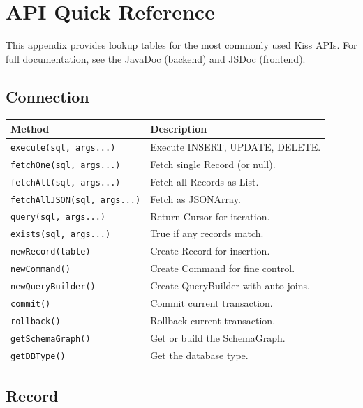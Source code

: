 \chapter{API Quick Reference}
\label{ch:api-reference}

This appendix provides lookup tables for the most commonly used Kiss APIs.  For full documentation, see the JavaDoc (backend) and JSDoc (frontend).

\section{Connection}
\label{sec:api-connection}

\begin{longtable}{P{4.8cm}P{5.7cm}}
\toprule
\textbf{Method} & \textbf{Description} \\
\midrule
\endhead
\texttt{execute(sql, args...)} & Execute INSERT, UPDATE, DELETE. \\
\texttt{fetchOne(sql, args...)} & Fetch single Record (or null). \\
\texttt{fetchAll(sql, args...)} & Fetch all Records as List. \\
\texttt{fetchAllJSON(sql, args...)} & Fetch as JSONArray. \\
\texttt{query(sql, args...)} & Return Cursor for iteration. \\
\texttt{exists(sql, args...)} & True if any records match. \\
\texttt{newRecord(table)} & Create Record for insertion. \\
\texttt{newCommand()} & Create Command for fine control. \\
\texttt{newQueryBuilder()} & Create QueryBuilder with auto-joins. \\
\texttt{commit()} & Commit current transaction. \\
\texttt{rollback()} & Rollback current transaction. \\
\texttt{getSchemaGraph()} & Get or build the SchemaGraph. \\
\texttt{getDBType()} & Get the database type. \\
\bottomrule
\end{longtable}

\section{Record}
\label{sec:api-record}

